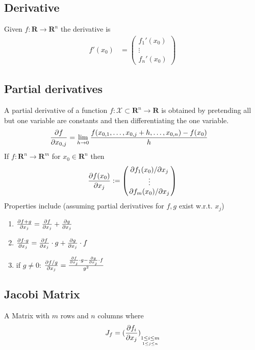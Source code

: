 \documentclass[8pt]{extarticle}
\newcommand{\R}{{\mathbb R}}
\newcommand{\X}{{\mathcal X}}
\newcommand{\ra}{{\rightarrow}}
\def\R{\mathbf{R}}
\begin{document}
\begin{multicols*}{3}
  \subsection{Derivative}
  Given $f: \R \ra \R^n$ the derivative is
  \begin{align*}
    f'(x_0) & = \begin{pmatrix}
      f_1'(x_0) \\
      \vdots    \\
      f_n'(x_0)
    \end{pmatrix}
  \end{align*}
  \subsection{Partial derivatives}
  A partial derivative of a function
  $f: \X \subset \R^n \ra \R$
  is obtained by pretending all
  but one variable are constants and then differentiating
  the one variable.
  \begin{align*}
    \pdv{f}{x_{0, j}} & = \lim_{h \ra 0} \frac{f(x_{0, 1}, \dots, x_{0, j} + h, \dots, x_{0, n}) - f(x_0)}{h}
  \end{align*}
  If $f: \R^n \ra \R^m$
  for $x_0 \in \R^n$ then
  \begin{align*}
    \pdv{f(x_0)}{x_j} := \begin{pmatrix}
      \pdv*{f_1(x_0)}{x_j} \\
      \vdots               \\
      \pdv*{f_m(x_0)}{x_j} \\
    \end{pmatrix}
  \end{align*}
  Properties include (assuming partial derivatives for $f, g$ exist w.r.t. $x_j$)
  \begin{enumerate}[label=(\arabic*)]
    \item $\pdv{f + g}{x_j} = \pdv{f}{x_j} + \pdv{g}{x_j}$
    \item $\pdv{f \cdot g}{x_j} = \pdv{f}{x_j} \cdot g + \pdv{g}{x_j} \cdot f$
    \item if $g \neq 0$: $\pdv{f / g}{x_j} = \frac{\pdv{f}{x_j} \cdot g - \pdv{g}{x_j} \cdot f}{g^2}$
  \end{enumerate}
  \subsection{Jacobi Matrix}
  A Matrix with $m$ rows and $n$ columns where
  \begin{align*}
    J_f = (\pdv{f_i}{x_j}) \underset{\underset{1 \leq j \leq n}{1 \leq i \leq m}}{}
  \end{align*}

\end{multicols*}
\end{document}
